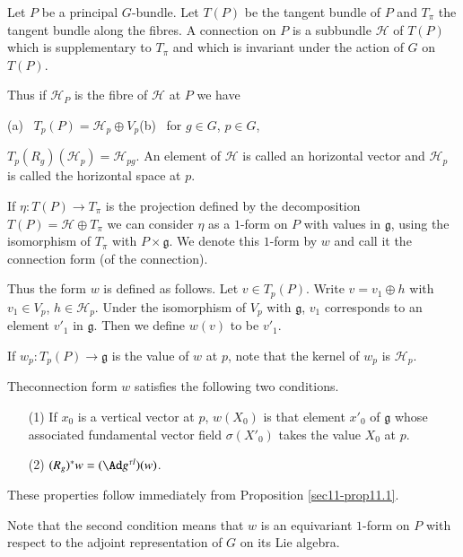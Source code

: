 \begin{defi*}
Let $P$ be a principal $G$-bundle. Let $T(P)$ be the tangent bundle of $P$ and $T_{\pi}$ the tangent bundle along the fibres. A connection on $P$ is a subbundle $\mathscr{H}$ of $T(P)$ which is supplementary to $T_{\pi}$ and which is invariant under the action of $G$ on $T(P)$.
\end{defi*}

Thus if $\mathscr{H}_{P}$ is the fibre of $\mathscr{H}$ at $P$ we have 
\begin{center}
(a)~ $T_{p}(P)=\mathscr{H}_{p}\oplus V_{p}$\qquad (b)~ for $g\in G$, $p\in G$,
\end{center}
$T_{p}(R_{g})(\mathscr{H}_{p})=\mathscr{H}_{pg}$. An element of $\mathscr{H}$ is called an horizontal vector and $\mathscr{H}_{p}$ is called the horizontal space at $p$.

If $\eta:T(P)\to T_{\pi}$ is the projection defined by the decomposition $T(P)=\mathscr{H}\oplus T_{\pi}$ we can consider $\eta$ as a $1$-form on $P$ with values in $\mathfrak{g}$, using the isomorphism of $T_{\pi}$ with $P\times \mathfrak{g}$. We denote this $1$-form by $w$ and call it the connection form (of the connection).

Thus the form $w$ is defined as follows. Let $v\in T_{p}(P)$. Write $v=v_{1}\oplus h$ with $v_{1}\in V_{p}$, $h\in \mathscr{H}_{p}$. Under the isomorphism of $V_{p}$ with $\mathfrak{g}$, $v_{1}$ corresponds to an element $v'_{1}$ in $\mathfrak{g}$. Then we define $w(v)$ to be $v'_{1}$.

If $w_{p}:T_{p}(P)\to \mathfrak{g}$ is the value of $w$ at $p$, note that the kernel of $w_{p}$ is $\mathscr{H}_{p}$.

The\pageoriginale connection form $w$ satisfies the following two conditions.
\begin{itemize}
\item[(1)] If $x_{0}$ is a vertical vector at $p$, $w(X_{0})$ is that element $x'_{0}$ of $\mathfrak{g}$ whose associated fundamental vector field $\sigma(X'_{0})$ takes the value $X_{0}$ at $p$.

\item[(2)] $(R_{g})^{*}w=(\Ad g^{\tau l})(w)$.
\end{itemize}

These properties follow immediately from Proposition \ref{sec11-prop11.1}.

Note that the second condition means that $w$ is an equivariant $1$-form on $P$ with respect to the adjoint representation of $G$ on its Lie algebra.

